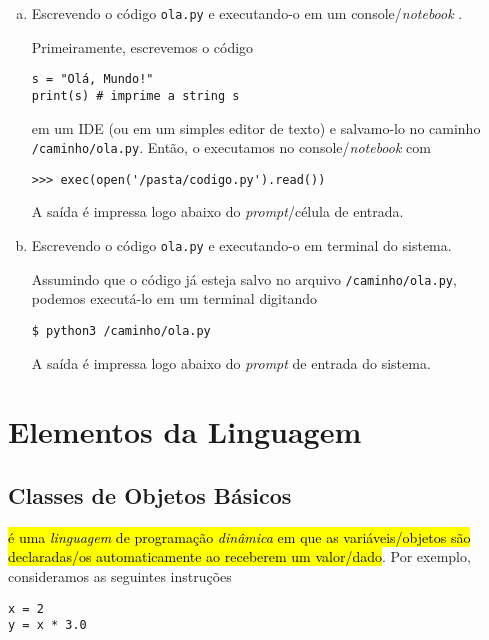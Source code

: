\documentclass[a4paper,10pt,twoside]{article}
\begin{document}
\begin{ex}
\begin{enumerate}[a)]
  \item Escrevendo o código \verb+ola.py+ e executando-o em um console/\textit{notebook} {\python}.
  
  Primeiramente, escrevemos o código

\begin{lstlisting}
s = "Olá, Mundo!"
print(s) # imprime a string s
\end{lstlisting}

em um IDE (ou em um simples editor de texto) e salvamo-lo no caminho \texttt{/caminho/ola.py}. Então, o executamos no console/\textit{notebook} {\python} com

\begin{lstlisting}
>>> exec(open('/pasta/codigo.py').read())
\end{lstlisting}

A saída é impressa logo abaixo do \textit{prompt}/célula de entrada.
  
  \item Escrevendo o código \verb+ola.py+ e executando-o em terminal do sistema.
  
  Assumindo que o código já esteja salvo no arquivo \texttt{/caminho/ola.py}, podemos executá-lo em um terminal digitando

\begin{lstlisting}
$ python3 /caminho/ola.py
\end{lstlisting}

  A saída é impressa logo abaixo do \textit{prompt} de entrada do sistema.
\end{enumerate}

\end{ex}

\section{Elementos da Linguagem}\label{sec_elem}

\subsection{Classes de Objetos Básicos}

\hl{{\python} é uma \emph{linguagem} de programação \emph{dinâmica} em que as variáveis/objetos são declaradas/os automaticamente ao receberem um valor/dado}. Por exemplo, consideramos as seguintes instruções

\begin{lstlisting}
x = 2
y = x * 3.0
\end{lstlisting}
\end{document}
